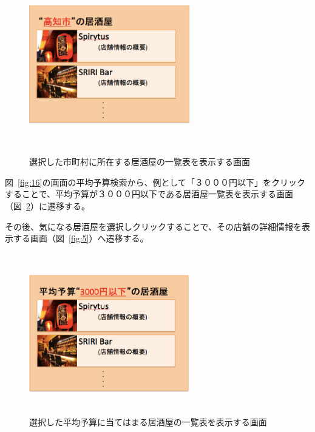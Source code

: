 \documentclass[a4j,titlepage]{jarticle}
\begin{document}
\begin {figure}[!htbp]
    \begin{center}
    \includegraphics [height=7cm, width=7cm]{17.eps}
　　    \caption {選択した市町村に所在する居酒屋の一覧表を表示する画面}
    \label {fig:17}
    \end{center}
\end {figure}



図~\ref{fig:16}の画面の平均予算検索から、例として「３０００円以下」をクリックすることで、平均予算が３０００円以下である居酒屋一覧表を表示する画面（図~\ref{fig:18}）に遷移する。



その後、気になる居酒屋を選択しクリックすることで、その店舗の詳細情報を表示する画面（図~\ref{fig:5}）へ遷移する。


\begin {figure}[!htbp]
    \begin{center}
    \includegraphics [height=7cm, width=7cm]{18.eps}
    \caption {選択した平均予算に当てはまる居酒屋の一覧表を表示する画面}
    \label {fig:18}
    \end{center}
\end {figure}
\end{document}
